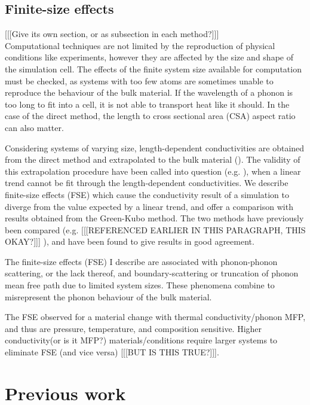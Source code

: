 \subsection{Finite-size effects}
[[[Give its own section, or as subsection in each method?]]]\\
Computational techniques are not limited by the reproduction of physical conditions like experiments, however they are affected by the size and shape of the simulation cell. The effects of the finite system size available for computation must be checked, as systems with too few atoms are sometimes unable to reproduce the behaviour of the bulk material. If the wavelength of a phonon is too long to fit into a cell, it is not able to transport heat like it should. In the case of the direct method, the length to cross sectional area (CSA) aspect ratio can also matter.

Considering systems of varying size, length-dependent conductivities are obtained from the direct method and extrapolated to the bulk material (\citet{Schelling2002}). The validity of this extrapolation procedure have been called into question (e.g. \citet{Sellan2010}), when a linear trend cannot be fit through the length-dependent conductivities. We describe finite-size effects (FSE) which cause the conductivity result of a simulation to diverge from the value expected by a linear trend, and offer a comparison with results obtained from the Green-Kubo method. The two methods have previously been compared (e.g. \citet{Schelling2002} [[[REFERENCED EARLIER IN THIS PARAGRAPH, THIS OKAY?]]] ), and have been found to give results in good agreement.

The finite-size effects (FSE) I describe are associated with phonon-phonon scattering, or the lack thereof, and boundary-scattering or truncation of phonon mean free path due to limited system sizes. These phenomena combine to misrepresent the phonon behaviour of the bulk material. 

The FSE observed for a material change with thermal conductivity/phonon MFP, and thus are pressure, temperature, and composition sensitive. Higher conductivity(or is it MFP?) materials/conditions require larger systems to eliminate FSE (and vice versa) [[[BUT IS THIS TRUE?]]].






\section{Previous work}

